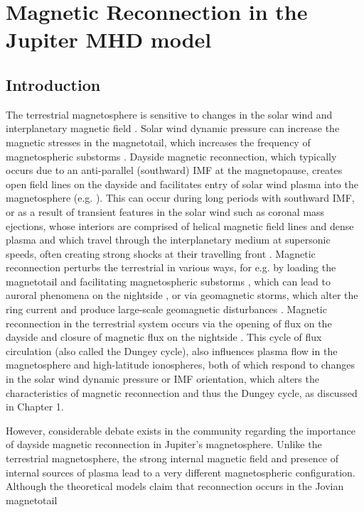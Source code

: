 \chapter{Magnetic Reconnection in the Jupiter MHD model}

\section{Introduction}
The terrestrial magnetosphere is sensitive to changes in the solar wind and interplanetary magnetic field \cite{Sibeck1991SolarMotion,McPherron2008ResponseWind}. Solar wind dynamic pressure can increase the magnetic stresses in the magnetotail, which increases the frequency of magnetospheric substorms \cite{Kokubun1977TriggeringDiscontinuities,Newell2011SolarTriggering,Newell2016SubstormSpeed}. Dayside magnetic reconnection, which typically occurs due to an anti-parallel (southward) IMF at the magnetopause, creates open field lines on the dayside and facilitates entry of solar wind plasma into the magnetosphere (e.g. ). This can occur during long periods with southward IMF, or as a result of transient features in the solar wind such as coronal mass ejections, whose interiors are comprised of helical magnetic field lines and dense plasma and which travel through the interplanetary medium at supersonic speeds, often creating strong shocks at their travelling front \cite{Webb2012CoronalObservations}. Magnetic reconnection perturbs the terrestrial in various ways, for e.g. by loading the magnetotail and facilitating magnetospheric substorms \cite{Morley2007OnOnsets}, which can lead to auroral phenomena on the nightside \cite{Elphinstone1996WhatSubstorm}, or via geomagnetic storms, which alter the ring current and produce large-scale geomagnetic disturbances \cite{Gonzalez1994WhatStorm}. Magnetic reconnection in the terrestrial system occurs via the opening of flux on the dayside and closure of magnetic flux on the nightside \cite{Dungey1961b}. This cycle of flux circulation (also called the Dungey cycle), also influences plasma flow in the magnetosphere and high-latitude ionospheres, both of which respond to changes in the solar wind dynamic pressure or IMF orientation, which alters the characteristics of magnetic reconnection and thus the Dungey cycle, as discussed in Chapter 1. 

However, considerable debate exists in the community regarding the importance of dayside magnetic reconnection in Jupiter's magnetosphere. Unlike the terrestrial magnetosphere, the strong internal magnetic field and presence of internal sources of plasma lead to a very different magnetospheric configuration. Although the theoretical models claim that reconnection occurs in the Jovian magnetotail

